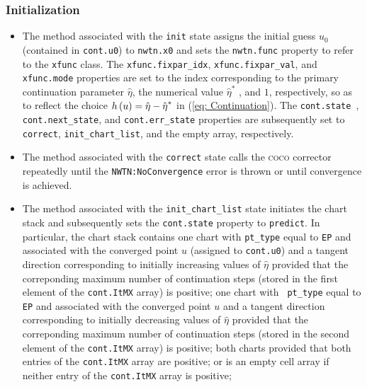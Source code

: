 \documentclass{article}
\begin{document}
\subsubsection{Initialization}

\begin{itemize}
\item The method associated with the \texttt{init} state assigns the initial
guess $u_{0}$ (contained in \texttt{cont.u0}) to \texttt{nwtn.x0} and sets
the \texttt{nwtn.func} property to refer to the \texttt{xfunc} class. The 
\texttt{xfunc.fixpar\_idx}, \texttt{xfunc.fixpar\_val}, and \texttt{%
xfunc.mode} properties are set to the index corresponding to the primary
continuation parameter $\hat{\eta}$, the numerical value $\hat{\eta}^{\ast }$%
, and $1$, respectively, so as to reflect the choice $h\left( u\right) =\hat{%
\eta}-\hat{\eta}^{\ast }$ in (\ref{eq: Continuation}). The \texttt{cont.state%
}, \texttt{cont.next\_state}, and \texttt{cont.err\_state} properties are
subsequently set to \texttt{correct}, \texttt{init\_chart\_list}, and the
empty array, respectively.

\item The method associated with the \texttt{correct} state calls the 
\textsc{coco} corrector repeatedly until the \texttt{NWTN:NoConvergence}
error is thrown or until convergence is achieved.

\item The method associated with the \texttt{init\_chart\_list} state
initiates the chart stack and subsequently sets the \texttt{cont.state}
property to \texttt{predict}. In particular, the chart stack contains one
chart with \texttt{pt\_type} equal to \texttt{EP} and associated with the
converged point $u$ (assigned to \texttt{cont.u0}) and a tangent direction
corresponding to initially increasing values of $\hat{\eta}$ provided that
the correponding maximum number of continuation steps (stored in the first
element of the \texttt{cont.ItMX} array) is positive; one chart with \texttt{%
pt\_type} equal to \texttt{EP} and associated with the converged point $u$
and a tangent direction corresponding to initially decreasing values of $%
\hat{\eta}$ provided that the correponding maximum number of continuation
steps (stored in the second element of the \texttt{cont.ItMX} array) is
positive; both charts provided that both entries of the \texttt{cont.ItMX}
array are positive; or is an empty cell array if neither entry of the 
\texttt{cont.ItMX} array is positive;


\end{itemize}
\end{document}
